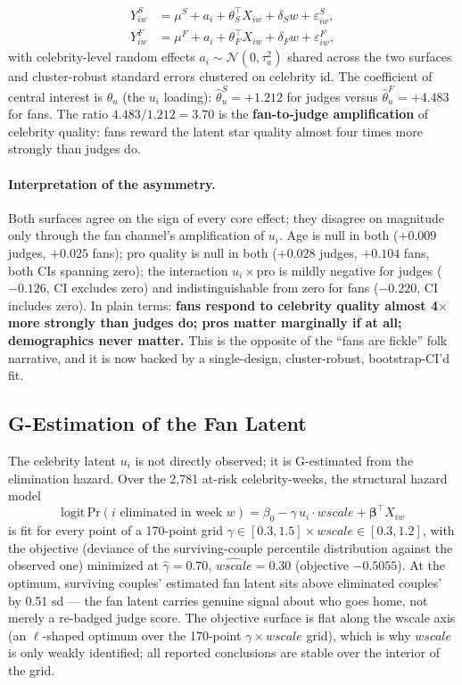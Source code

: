 \documentclass[11pt]{article}
\begin{document}
\begin{align}
Y^{S}_{iw} &= \mu^{S} + a_i + \theta_S^{\top} X_{iw} + \delta_S w + \varepsilon^{S}_{iw},
 \label{eq:judge}\\
Y^{F}_{iw} &= \mu^{F} + a_i + \theta_F^{\top} X_{iw} + \delta_F w + \varepsilon^{F}_{iw},
\label{eq:fan}
\end{align}
with celebrity-level random effects $a_i \sim \mathcal{N}(0, \tau_a^2)$ shared across the two
surfaces and cluster-robust standard errors clustered on celebrity id. The coefficient of central
interest is $\theta_{u}$ (the $u_i$ loading): $\hat{\theta}^{S}_{u} = +1.212$ for judges versus
$\hat{\theta}^{F}_{u} = +4.483$ for fans. The ratio $4.483/1.212 = 3.70$ is the
\textbf{fan-to-judge amplification} of celebrity quality: fans reward the latent star quality
almost four times more strongly than judges do.

\paragraph{Interpretation of the asymmetry.} Both surfaces agree on the sign of every core
effect; they disagree on magnitude only through the fan channel's amplification of $u_i$. Age is
null in both ($+0.009$ judges, $+0.025$ fans); pro quality is null in both ($+0.028$ judges,
$+0.104$ fans, both CIs spanning zero); the interaction $u_i \times \mathrm{pro}$ is mildly
negative for judges ($-0.126$, CI excludes zero) and indistinguishable from zero for fans
($-0.220$, CI includes zero). In plain terms: \textbf{fans respond to celebrity quality almost
4$\times$ more strongly than judges do; pros matter marginally if at all; demographics never
matter.} This is the opposite of the ``fans are fickle'' folk narrative, and it is now backed by
a single-design, cluster-robust, bootstrap-CI'd fit.

\subsection{G-Estimation of the Fan Latent}

The celebrity latent $u_i$ is not directly observed; it is G-estimated from the elimination
hazard. Over the 2,781 at-risk celebrity-weeks, the structural hazard model
\begin{equation}
\mathrm{logit}\, \mathrm{Pr}(i \text{ eliminated in week } w)
= \beta_0 - \gamma\, u_i \cdot wscale + \boldsymbol{\beta}^{\top} X_{iw}
\label{eq:hazard}
\end{equation}
is fit for every point of a 170-point grid $\gamma \in [0.3, 1.5] \times wscale \in [0.3, 1.2]$,
with the objective (deviance of the surviving-couple percentile distribution against the
observed one) minimized at $\hat{\gamma} = 0.70$, $\widehat{wscale} = 0.30$ (objective $-0.5055$).
At the optimum, surviving couples' estimated fan latent sits above eliminated couples' by 0.51
sd --- the fan latent carries genuine signal about who goes home, not merely a re-badged judge
score. The objective surface is flat along the wscale axis (an $\ell$-shaped optimum over the
170-point $\gamma \times wscale$ grid), which is why $wscale$ is only weakly identified; all
reported conclusions are stable over the interior of the grid.
\end{document}
